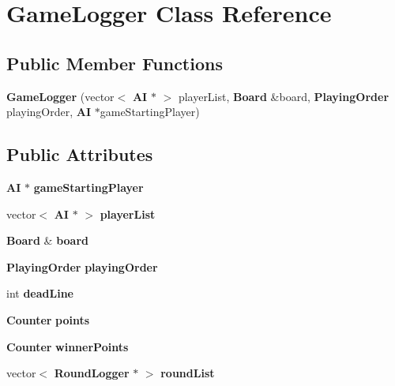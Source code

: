 \section{Game\-Logger Class Reference}
\label{class_game_logger}
\subsection*{Public Member Functions}
\begin{DoxyCompactItemize}
\item 
{\bfseries Game\-Logger} (vector$<$ {\bf A\-I} $\ast$ $>$ player\-List, {\bf Board} \&board, {\bf Playing\-Order} playing\-Order, {\bf A\-I} $\ast$game\-Starting\-Player)\label{class_game_logger_afffa75291eca36b31bee8f51cb74f7cd}

\end{DoxyCompactItemize}
\subsection*{Public Attributes}
\begin{DoxyCompactItemize}
\item 
{\bf A\-I} $\ast$ {\bfseries game\-Starting\-Player}\label{class_game_logger_aa03a6b6665f313bb467f62ec2571bac7}

\item 
vector$<$ {\bf A\-I} $\ast$ $>$ {\bfseries player\-List}\label{class_game_logger_afc4bafaa225eefcb8449652ca838296c}

\item 
{\bf Board} \& {\bfseries board}\label{class_game_logger_a3d3f1f36f81207d7941880335743fd99}

\item 
{\bf Playing\-Order} {\bfseries playing\-Order}\label{class_game_logger_a4b1ae46a49a5024fff5733edb086cf06}

\item 
int {\bfseries dead\-Line}\label{class_game_logger_a82b29d0bcb07c6cf3f4bd2f9ce0d448d}

\item 
{\bf Counter} {\bf points}
\item 
{\bf Counter} {\bfseries winner\-Points}\label{class_game_logger_ab8c908df65171b42b385caeac894ebaf}

\item 
vector$<$ {\bf Round\-Logger} $\ast$ $>$ {\bfseries round\-List}\label{class_game_logger_a9aa351384a0fa9c5d16f4b28cbb9b088}

\end{DoxyCompactItemize}



